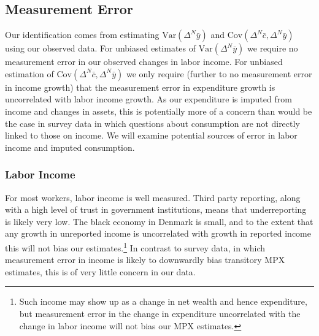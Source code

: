 \documentclass[titlepage]{\econtex}\newcommand{\texname}{ConsumptionHeterogeneity}
\begin{document}
	\subsection{Measurement Error} \label{Measurement_error}
	Our identification comes from estimating $\mathrm{Var}(\Delta^N \bar{y})$ and $\mathrm{Cov}(\Delta^N \bar{c},\Delta^N \bar{y})$ using our observed data. For unbiased estimates of $\mathrm{Var}(\Delta^N \bar{y})$ we require no measurement error in our observed changes in labor income. For unbiased estimation of $\mathrm{Cov}(\Delta^N \bar{c},\Delta^N \bar{y})$ we only require (further to no measurement error in income growth) that the measurement error in expenditure growth is uncorrelated with labor income growth. As our expenditure is imputed from income and changes in assets, this is potentially more of a concern than would be the case in survey data in which questions about consumption are not directly linked to those on income. We will examine potential sources of error in labor income and imputed consumption.
	
	\subsubsection{Labor Income}
	For most workers, labor income is well measured. Third party reporting, along with a high level of trust in government institutions, means that underreporting is likely very low. The black economy in Denmark is small, and to the extent that any growth in unreported income is uncorrelated with growth in reported income this will not bias our estimates.\footnote{Such income may show up as a change in net wealth and hence expenditure, but measurement error in the change in expenditure uncorrelated with the change in labor income will not bias our MPX estimates.} In contrast to survey data, in which measurement error in income is likely to downwardly bias transitory MPX estimates, this is of very little concern in our data.
	
\end{document}
